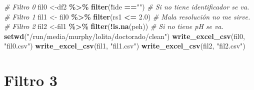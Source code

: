 \documentclass[
]{book}
\newenvironment{Shaded}{\begin{snugshade}}{\end{snugshade}}
\newcommand{\BuiltInTok}[1]{#1}
\newcommand{\CommentTok}[1]{\textcolor[rgb]{0.56,0.35,0.01}{\textit{#1}}}
\newcommand{\FloatTok}[1]{\textcolor[rgb]{0.00,0.00,0.81}{#1}}
\newcommand{\FunctionTok}[1]{\textcolor[rgb]{0.00,0.00,0.00}{#1}}
\newcommand{\KeywordTok}[1]{\textcolor[rgb]{0.13,0.29,0.53}{\textbf{#1}}}
\newcommand{\NormalTok}[1]{#1}
\newcommand{\OperatorTok}[1]{\textcolor[rgb]{0.81,0.36,0.00}{\textbf{#1}}}
\newcommand{\StringTok}[1]{\textcolor[rgb]{0.31,0.60,0.02}{#1}}
\begin{document}
\begin{Shaded}
\begin{Highlighting}[]
\CommentTok{\# Filtro 0}
\NormalTok{fil0 \textless{}{-}df2 }\OperatorTok{\%\textgreater{}\%}
\StringTok{  }\KeywordTok{filter}\NormalTok{(}\OperatorTok{!}\NormalTok{ide }\OperatorTok{==}\StringTok{""}\NormalTok{) }\CommentTok{\# Si no tiene identificador se va.}
\CommentTok{\# Filtro 1}
\NormalTok{fil1 \textless{}{-}}\StringTok{ }\NormalTok{fil0 }\OperatorTok{\%\textgreater{}\%}
\StringTok{  }\KeywordTok{filter}\NormalTok{(rs1 }\OperatorTok{\textless{}=}\StringTok{ }\FloatTok{2.0}\NormalTok{) }\CommentTok{\# Mala resolución no me sirve.}
\CommentTok{\# Filtro 2}
\NormalTok{fil2 \textless{}{-}fil1 }\OperatorTok{\%\textgreater{}\%}
\StringTok{  }\KeywordTok{filter}\NormalTok{(}\OperatorTok{!}\KeywordTok{is.na}\NormalTok{(peh)) }\CommentTok{\# Si no tiene pH se va.}
\KeywordTok{setwd}\NormalTok{(}\StringTok{"/run/media/murphy/lolita/doctorado/clean"}\NormalTok{)}
\KeywordTok{write\_excel\_csv}\NormalTok{(fil0, }\StringTok{"fil0.csv"}\NormalTok{)}
\KeywordTok{write\_excel\_csv}\NormalTok{(fil1, }\StringTok{"fil1.csv"}\NormalTok{)}
\KeywordTok{write\_excel\_csv}\NormalTok{(fil2, }\StringTok{"fil2.csv"}\NormalTok{)}
\end{Highlighting}
\end{Shaded}

\hypertarget{filtro-3}{%
\section{Filtro 3}\label{filtro-3}}

\begin{Shaded}
\end{Shaded}
\end{document}
